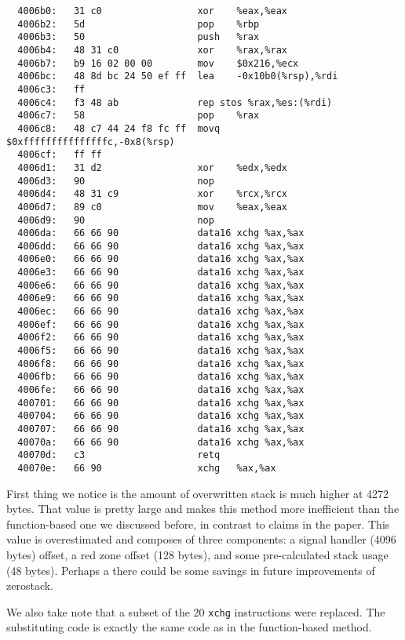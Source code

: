 \documentclass[a4paper,10pt,openright]{memoir}
\newcommand{\code}[1]{\texttt{#1}}
\begin{document}
\begin{verbatim}
  4006b0:   31 c0                 xor    %eax,%eax
  4006b2:   5d                    pop    %rbp
  4006b3:   50                    push   %rax
  4006b4:   48 31 c0              xor    %rax,%rax
  4006b7:   b9 16 02 00 00        mov    $0x216,%ecx
  4006bc:   48 8d bc 24 50 ef ff  lea    -0x10b0(%rsp),%rdi
  4006c3:   ff 
  4006c4:   f3 48 ab              rep stos %rax,%es:(%rdi)
  4006c7:   58                    pop    %rax
  4006c8:   48 c7 44 24 f8 fc ff  movq   $0xfffffffffffffffc,-0x8(%rsp)
  4006cf:   ff ff 
  4006d1:   31 d2                 xor    %edx,%edx
  4006d3:   90                    nop
  4006d4:   48 31 c9              xor    %rcx,%rcx
  4006d7:   89 c0                 mov    %eax,%eax
  4006d9:   90                    nop
  4006da:   66 66 90              data16 xchg %ax,%ax
  4006dd:   66 66 90              data16 xchg %ax,%ax
  4006e0:   66 66 90              data16 xchg %ax,%ax
  4006e3:   66 66 90              data16 xchg %ax,%ax
  4006e6:   66 66 90              data16 xchg %ax,%ax
  4006e9:   66 66 90              data16 xchg %ax,%ax
  4006ec:   66 66 90              data16 xchg %ax,%ax
  4006ef:   66 66 90              data16 xchg %ax,%ax
  4006f2:   66 66 90              data16 xchg %ax,%ax
  4006f5:   66 66 90              data16 xchg %ax,%ax
  4006f8:   66 66 90              data16 xchg %ax,%ax
  4006fb:   66 66 90              data16 xchg %ax,%ax
  4006fe:   66 66 90              data16 xchg %ax,%ax
  400701:   66 66 90              data16 xchg %ax,%ax
  400704:   66 66 90              data16 xchg %ax,%ax
  400707:   66 66 90              data16 xchg %ax,%ax
  40070a:   66 66 90              data16 xchg %ax,%ax
  40070d:   c3                    retq   
  40070e:   66 90                 xchg   %ax,%ax
\end{verbatim}

First thing we notice is the amount of overwritten stack is much higher 
at 4272 bytes. That value is pretty large and makes this method more 
inefficient than the function-based one we discussed before, in 
contrast to claims in the paper\cite{whatyouc}. This value is 
overestimated and composes of three components: a signal handler (4096 
bytes) offset, a red zone offset (128 bytes), and some pre-calculated 
stack usage (48 bytes). Perhaps a there could be some savings in future 
improvements of zerostack.

We also take note that a subset of the 20 \code{xchg} instructions were 
replaced. The substituting code is exactly the same code as in the 
function-based method.
\end{document}
